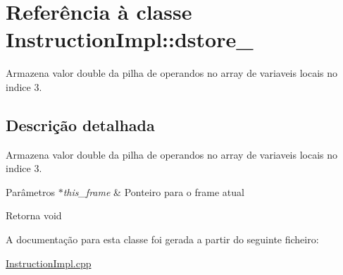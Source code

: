 \hypertarget{class_instruction_impl_1_1dstore__3}{}\section{Referência à classe Instruction\+Impl\+:\+:dstore\+\_}
\label{class_instruction_impl_1_1dstore__3}


Armazena valor double da pilha de operandos no array de variaveis locais no indice 3.  




\subsection{Descrição detalhada}
Armazena valor double da pilha de operandos no array de variaveis locais no indice 3. 


\begin{DoxyParams}{Parâmetros}
{\em $\ast$this\+\_\+frame} & Ponteiro para o frame atual \\
\hline
\end{DoxyParams}
\begin{DoxyReturn}{Retorna}
void 
\end{DoxyReturn}


A documentação para esta classe foi gerada a partir do seguinte ficheiro\+:\begin{DoxyCompactItemize}
\item 
\hyperlink{_instruction_impl_8cpp}{Instruction\+Impl.\+cpp}\end{DoxyCompactItemize}
